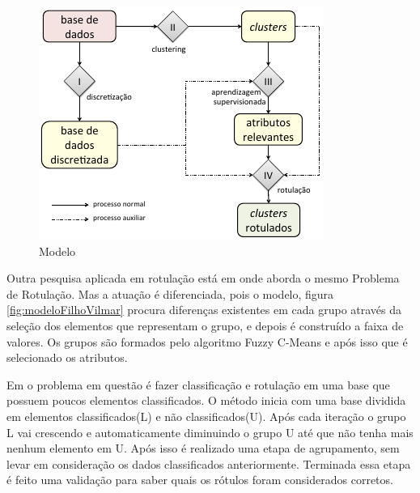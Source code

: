 \begin{figure}[h]
        \centering
        \includegraphics[scale=0.8]{figs/modeloLopes.png}
        \caption{Modelo \cite{Lopes}} 
        \label{fig:modeloLOPES}
\end{figure}

Outra pesquisa aplicada em rotulação está em \cite{Filho2015} onde aborda o mesmo Problema de Rotulação. Mas a atuação é diferenciada, pois o modelo, figura \ref{fig:modeloFilhoVilmar} procura diferenças existentes em cada grupo através da seleção dos elementos que representam o grupo, e depois é construído a faixa de valores. Os grupos são formados pelo algoritmo Fuzzy C-Means e após isso que é selecionado os atributos. 


Em \cite{Metodo2015} o problema em questão é fazer classificação e rotulação em uma base que possuem poucos elementos classificados. O método inicia com uma base dividida em elementos classificados(L) e não classificados(U). Após cada iteração o grupo L vai crescendo e automaticamente diminuindo o grupo U até que não tenha mais nenhum elemento em U. Após isso é realizado uma etapa de agrupamento, sem levar em consideração os dados classificados anteriormente. Terminada essa etapa é feito uma validação para saber quais os rótulos foram considerados corretos.

